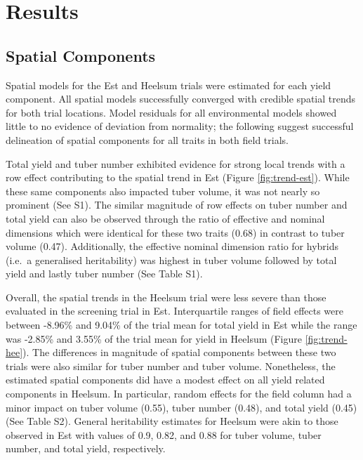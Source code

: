 \section{Results}

\subsection{Spatial Components}\label{spatial-components}

Spatial models for the Est and Heelsum trials were estimated for each yield component. All spatial models successfully converged with credible spatial trends for both trial locations. Model residuals for all environmental models showed little to no evidence of deviation from normality; the following suggest successful delineation of spatial components for all traits in both field trials.

Total yield and tuber number exhibited evidence for strong local trends with a row effect contributing to the spatial trend in Est (Figure \ref{fig:trend-est}). While these same components also impacted tuber volume, it was not nearly so prominent (See S1). The similar magnitude of row effects on tuber number and total yield can also be observed through the ratio of effective and nominal dimensions which were identical for these two traits (0.68) in contrast to tuber volume (0.47). Additionally, the effective nominal dimension ratio for hybrids (i.e.~a generalised heritability) was highest in tuber volume followed by total yield and lastly tuber number (See Table S1).

Overall, the spatial trends in the Heelsum trial were less severe than those evaluated in the screening trial in Est. Interquartile ranges of field effects were between -8.96\% and 9.04\% of the trial mean for total yield in Est while the range was -2.85\% and 3.55\% of the trial mean for yield in Heelsum (Figure \ref{fig:trend-hee}). The differences in magnitude of spatial components between these two trials were also similar for tuber number and tuber volume. Nonetheless, the estimated spatial components did have a modest effect on all yield related components in Heelsum. In particular, random effects for the field column had a minor impact on tuber volume (0.55), tuber number (0.48), and total yield (0.45) (See Table S2). General heritability estimates for Heelsum were akin to those observed in Est with values of 0.9, 0.82, and 0.88 for tuber volume, tuber number, and total yield, respectively.

